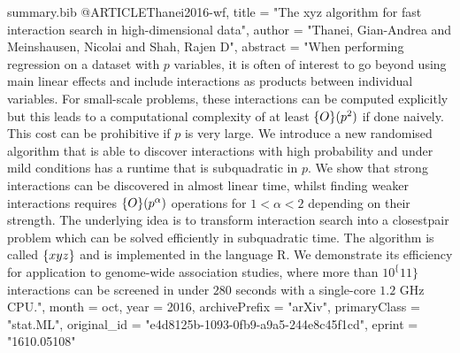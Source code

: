 \begin{filecontents*}{summary.bib}
@ARTICLE{Thanei2016-wf,
	title         = "The xyz algorithm for fast interaction search in
	high-dimensional data",
	author        = "Thanei, Gian-Andrea and Meinshausen, Nicolai and Shah, Rajen
	D",
	abstract      = "When performing regression on a dataset with $p$ variables,
	it is often of interest to go beyond using main linear
	effects and include interactions as products between
	individual variables. For small-scale problems, these
	interactions can be computed explicitly but this leads to a
	computational complexity of at least $\mathcal\{O\}(p^2)$ if
	done naively. This cost can be prohibitive if $p$ is very
	large. We introduce a new randomised algorithm that is able
	to discover interactions with high probability and under
	mild conditions has a runtime that is subquadratic in $p$.
	We show that strong interactions can be discovered in almost
	linear time, whilst finding weaker interactions requires
	$\mathcal\{O\}(p^\alpha)$ operations for $1 < \alpha < 2$
	depending on their strength. The underlying idea is to
	transform interaction search into a closestpair problem
	which can be solved efficiently in subquadratic time. The
	algorithm is called $\mathit\{xyz\}$ and is implemented in
	the language R. We demonstrate its efficiency for
	application to genome-wide association studies, where more
	than $10^\{11\}$ interactions can be screened in under $280$
	seconds with a single-core $1.2$ GHz CPU.",
	month         =  oct,
	year          =  2016,
	archivePrefix = "arXiv",
	primaryClass  = "stat.ML",
	original_id   = "e4d8125b-1093-0fb9-a9a5-244e8c45f1cd",
	eprint        = "1610.05108"
}
\end{filecontents*}

\documentclass{article}

\usepackage[colorinlistoftodos]{todonotes}
\usepackage{amsmath}



\listoftodos
\clearpage

\section{Data Generation}
We simulated siRNA–gene perturbation matrices based on four
commercially available genome–wide libraries for 20,822 human genes from Qiagen with an overall size of 90,000 siRNAs. First, we predicted sequence dependent off-targets using TargetScan [23] for each siRNA as described in [13]. We thresholded all predictions to be 1 if
larger than zero and 0 otherwise
to produce the matrix $Q$.

